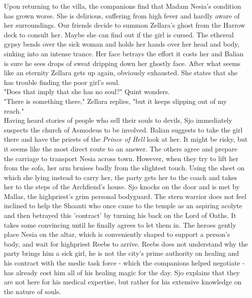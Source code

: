 Upon returning to the villa, the companions find that Madam Nesia's condition has grown worse. She is delirious, suffering from high fever and hardly aware of her surroundings. Our friends decide to summon Zellara's ghost from the Harrow deck to consult her. Maybe she can find out if the girl is cursed. The ethereal gypsy bends over the sick woman and holds her hands over her head and body, sinking into an intense trance. Her face betrays the effort it costs her and Balian is sure he sees drops of sweat dripping down her ghostly face. After what seems like an eternity Zellara gets up again, obviously exhausted. She states that she has trouble finding the poor girl's soul.\\

"Does that imply that she has no soul?" Quint wonders.\\

"There is something there," Zellara replies, "but it keeps slipping out of my reach."\\

Having heard stories of people who sell their souls to devils, Sjo immediately suspects the church of Asmodeus to be involved. Balian suggests to take the girl there and have the priests of the {\itshape Prince of Hell} look at her. It might be risky, but it seems like the most direct route to an answer. The others agree and prepare the carriage to transport Nesia across town. However, when they try to lift her from the sofa, her arm bruises badly from the slightest touch. Using the sheet on which she lying instead to carry her, the party gets her to the coach and takes her to the steps of the Archfiend's house. Sjo knocks on the door and is met by Mallas, the highpriest's grim personal bodyguard. The stern warrior does not feel inclined to help the Shoanti who once came to the temple as an aspiring acolyte and then betrayed this 'contract' by turning his back on the Lord of Oaths. It takes some convincing until he finally agrees to let them in. The heroes gently place Nesia on the altar, which is conveniently shaped to support a person's body, and wait for highpriest Reebs to arrive. Reebs does not understand why the party brings him a sick girl, he is not the city's prime authority on healing and his contract with the medic task force - which the companions helped negotiate - has already cost him all of his healing magic for the day. Sjo explains that they are not here for his medical expertise, but rather for his extensive knowledge on the nature of souls.\\

